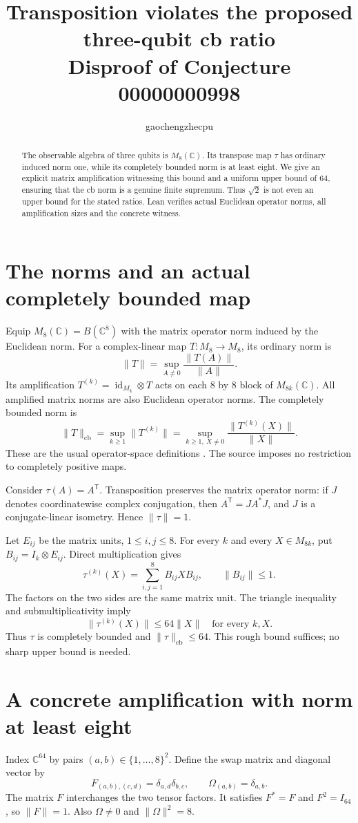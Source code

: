 \documentclass[11pt]{article}
\title{Transposition violates the proposed three-qubit cb ratio\\
\large Disproof of Conjecture 00000000998}
\author{gaochengzhecpu}\date{}
\newcommand{\cb}{\mathrm{cb}}
\begin{document}
\maketitle
\begin{abstract}
The observable algebra of three qubits is $M_8(\mathbb C)$.
Its transpose map $\tau$ has ordinary induced norm one,
while its completely bounded norm is at least eight.
We give an explicit matrix amplification witnessing this
bound and a uniform upper bound of $64$, ensuring that
the cb norm is a genuine finite supremum. Thus $\sqrt2$
is not even an upper bound for the stated ratios.
Lean verifies actual Euclidean operator norms, all
amplification sizes and the concrete witness.
\end{abstract}

\section*{The norms and an actual completely bounded map}
Equip $M_8(\mathbb C)=B(\mathbb C^8)$ with the matrix
operator norm induced by the Euclidean norm. For a
complex-linear map $T:M_8\to M_8$, its ordinary norm is
\[
 \|T\|=\sup_{A\ne0}\frac{\|T(A)\|}{\|A\|}.
\]
Its amplification $T^{(k)}=\operatorname{id}_{M_k}\otimes T$
acts on each $8$ by $8$ block of $M_{8k}(\mathbb C)$.
All amplified matrix norms are also Euclidean operator
norms. The completely bounded norm is
\[
 \|T\|_{\cb}=\sup_{k\geq1}\|T^{(k)}\|
 =\sup_{k\geq1,\ X\ne0}\frac{\|T^{(k)}(X)\|}{\|X\|}.
\]
These are the usual operator-space definitions
\cite[p.~22]{paulsen}. The source imposes no restriction
to completely positive maps.

Consider $\tau(A)=A^{\mathsf T}$. Transposition preserves
the matrix operator norm: if $J$ denotes coordinatewise
complex conjugation, then $A^{\mathsf T}=JA^*J$, and $J$
is a conjugate-linear isometry. Hence $\|\tau\|=1$.

Let $E_{ij}$ be the matrix units, $1\leq i,j\leq8$.
For every $k$ and every $X\in M_{8k}$, put
$B_{ij}=I_k\otimes E_{ij}$. Direct multiplication gives
\[
 \tau^{(k)}(X)=\sum_{i,j=1}^{8}B_{ij}XB_{ij},
 \qquad \|B_{ij}\|\leq1.
\]
The factors on the two sides are the same matrix unit.
The triangle inequality and submultiplicativity imply
\[
 \|\tau^{(k)}(X)\|\leq64\|X\|\quad\text{for every }k,X.
\]
Thus $\tau$ is completely bounded and $\|\tau\|_{\cb}\leq64$.
This rough bound suffices; no sharp upper bound is needed.

\newpage
\section*{A concrete amplification with norm at least eight}
Index $\mathbb C^{64}$ by pairs $(a,b)\in\{1,\ldots,8\}^2$.
Define the swap matrix and diagonal vector by
\[
 F_{(a,b),(c,d)}=\delta_{a,d}\delta_{b,c},\qquad
 \Omega_{(a,b)}=\delta_{a,b}.
\]
The matrix $F$ interchanges the two tensor factors.
It satisfies $F^*=F$ and $F^2=I_{64}$, so $\|F\|=1$.
Also $\Omega\ne0$ and $\|\Omega\|^2=8$.
\end{document}
